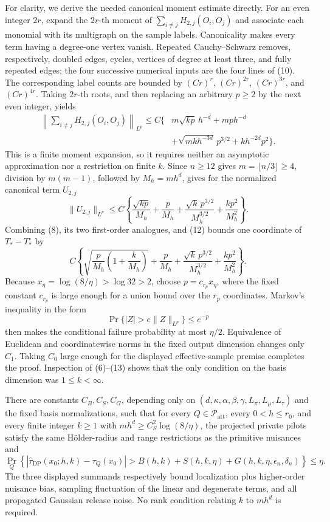 For clarity, we derive the needed canonical moment estimate directly.  For an even integer \(2r\), expand the \(2r\)-th moment of \(\sum_{i\ne j}H_{2,j}(O_i,O_j)\) and associate each monomial with its multigraph on the sample labels.  Canonicality makes every term having a degree-one vertex vanish.  Repeated Cauchy--Schwarz removes, respectively, doubled edges, cycles, vertices of degree at least three, and fully repeated edges; the four successive numerical inputs are the four lines of (10).  The corresponding label counts are bounded by \((Cr)^r\), \((Cr)^{2r}\), \((Cr)^{3r}\), and \((Cr)^{4r}\).  Taking \(2r\)-th roots, and then replacing an arbitrary \(p\ge2\) by the next even integer, yields
\[
 \begin{aligned}
 \left\lVert\sum_{i\ne j}H_{2,j}(O_i,O_j)\right\rVert_{L^p}
 \le C\{&m\sqrt{kp}\,h^{-d}+mp h^{-d}\\
          &+\sqrt{mk h^{-3d}}\,p^{3/2}+kh^{-2d}p^2\}.
 \end{aligned}                                                \tag{11}
\]
This is a finite moment expansion, so it requires neither an asymptotic approximation nor a restriction on finite \(k\).  Since \(n\ge12\) gives \(m=\lfloor n/3\rfloor\ge4\), division by \(m(m-1)\), followed by \(M_h=mh^d\), gives for the normalized canonical term \(U_{2,j}\)
\[
 \lVert U_{2,j}\rVert_{L^p}
 \le C\left\{
 \frac{\sqrt{kp}}{M_h}+\frac p{M_h}
 +\frac{\sqrt{k}\,p^{3/2}}{M_h^{3/2}}
 +\frac{kp^2}{M_h^2}\right\}.                               \tag{12}
\]
Combining (8), its two first-order analogues, and (12) bounds one coordinate of \(T_*-T_*^\circ\) by
\[
 C\left\{
 \sqrt{\frac p{M_h}\left(1+\frac{k}{M_h}\right)}
 +\frac p{M_h}
 +\frac{\sqrt{k}\,p^{3/2}}{M_h^{3/2}}
 +\frac{kp^2}{M_h^2}\right\}.                               \tag{13}
\]
Because \(x_\eta=\log(8/\eta)>\log 32>2\), choose \(p=c_{r_p}x_\eta\), where the fixed constant \(c_{r_p}\) is large enough for a union bound over the \(r_p\) coordinates.  Markov's inequality in the form
\[
 \Pr\{|Z|>e\lVert Z\rVert_{L^p}\}\le e^{-p}
\]
then makes the conditional failure probability at most \(\eta/2\).  Equivalence of Euclidean and coordinatewise norms in the fixed output dimension changes only \(C_1\).  Taking \(C_0\) large enough for the displayed effective-sample premise completes the proof.  Inspection of (6)--(13) shows that the only condition on the basis dimension was \(1\le k<\infty\).

There are constants \(C_B,C_S,C_G\), depending only on \((d,\kappa,\alpha,\beta,\gamma,L_\pi,L_\mu,L_\tau)\) and the fixed basis normalizations, such that for every \(Q\in\mathcal P_{\mathrm{att}}\), every \(0<h\le r_0\), and every finite integer \(k\ge1\) with \(m h^d\ge C_S^2\log(8/\eta)\), the projected private pilots satisfy the same H\"older-radius and range restrictions as the primitive nuisances and
\[
 \Pr_Q\!\left\{\left|\widehat\tau_{\mathrm{DP}}(x_0;h,k)-\tau_Q(x_0)\right|>
 B(h,k)+S(h,k,\eta)+G(h,k,\eta,\epsilon_n,\delta_n)\right\}\le\eta.
\]
The three displayed summands respectively bound localization plus higher-order nuisance bias, sampling fluctuation of the linear and degenerate terms, and all propagated Gaussian release noise.  No rank condition relating \(k\) to \(m h^d\) is required.

